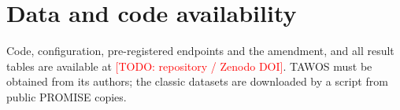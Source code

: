 \documentclass[preprint,12pt,authoryear]{elsarticle}
\newcommand{\todo}[1]{\textcolor{red}{[TODO: #1]}}
\begin{document}
\section*{Data and code availability}
Code, configuration, pre-registered endpoints and the amendment, and all result tables are available at
\todo{repository / Zenodo DOI}.  TAWOS must be obtained from its authors; the classic datasets are downloaded by a
script from public PROMISE copies.



\end{document}
